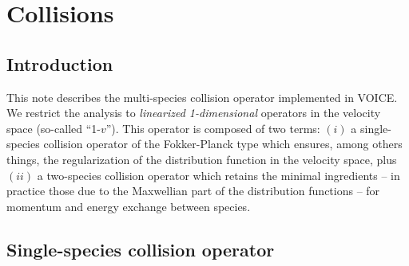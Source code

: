 \documentclass[11pt]{article}
\begin{document}
\section{Collisions}
\label{sec:collisions}
\subsection{Introduction}
This note describes the multi-species collision operator implemented in VOICE. We restrict the analysis to \emph{linearized 1-dimensional} operators in the velocity space (so-called ``1-$v$''). This operator is composed of two terms: $(i)$ a single-species collision operator of the Fokker-Planck type which ensures, among others things, the regularization of the distribution function in the velocity space, plus $(ii)$ a two-species collision operator which retains the minimal ingredients -- in practice those due to the Maxwellian part of the distribution functions -- for momentum and energy exchange between species.

\subsection{Single-species collision operator}
\end{document}
